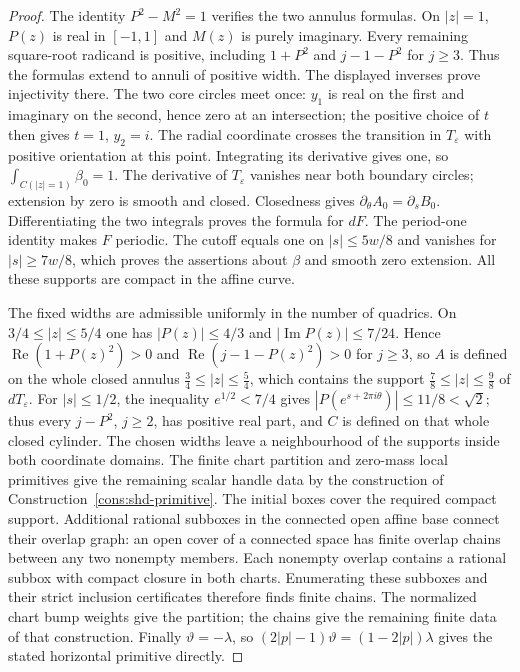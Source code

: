 \begin{proof}
The identity $P^2-M^2=1$ verifies the two annulus formulas. On $|z|=1$, $P(z)$ is real in $[-1,1]$ and $M(z)$ is purely
imaginary. Every remaining square-root radicand is positive, including $1+P^2$ and $j-1-P^2$ for $j\ge3$.
Thus the formulas extend to annuli of positive width. The displayed inverses prove injectivity there.
The two core circles meet once: $y_1$ is real on the first and imaginary on the second, hence zero at an intersection;
the positive choice of $t$ then gives $t=1$, $y_2=i$. The radial coordinate crosses the transition in $T_\varepsilon$
with positive orientation at this point. Integrating its derivative gives one, so $\int_{C(|z|=1)}\beta_0=1$.
The derivative of $T_\varepsilon$ vanishes near both boundary circles; extension by zero is smooth and closed.
Closedness gives $\partial_\theta A_0=\partial_s B_0$. Differentiating the two integrals proves the formula for $dF$.
The period-one identity makes $F$ periodic. The cutoff equals one on $|s|\le5w/8$ and vanishes for $|s|\ge7w/8$,
which proves the assertions about $\beta$ and smooth zero extension. All these supports are compact in the affine curve.

The fixed widths are admissible uniformly in the number of quadrics. On $3/4\le|z|\le5/4$ one has
$|P(z)|\le4/3$ and $|\operatorname{Im}P(z)|\le7/24$. Hence $\operatorname{Re}(1+P(z)^2)>0$ and
$\operatorname{Re}(j-1-P(z)^2)>0$ for $j\ge3$, so $A$ is defined on the whole closed annulus $\frac34\le|z|\le\frac54$, which contains the support
$\frac78\le|z|\le\frac98$ of $dT_\varepsilon$.
For $|s|\le1/2$, the inequality $e^{1/2}<7/4$ gives $|P(e^{s+2\pi i\theta})|\le11/8<\sqrt2$;
thus every $j-P^2$, $j\ge2$, has positive real part, and $C$ is defined on that whole closed cylinder.
The chosen widths leave a neighbourhood of the supports inside both coordinate domains.
The finite chart partition and zero-mass local primitives give the remaining scalar handle data by the construction of
Construction~\ref{cons:shd-primitive}. The initial boxes cover the required compact support.
Additional rational subboxes in the connected open affine base connect their overlap graph: an open cover of a connected
space has finite overlap chains between any two nonempty members. Each nonempty overlap contains a rational subbox
with compact closure in both charts. Enumerating these subboxes and their strict inclusion certificates therefore
finds finite chains. The normalized chart bump weights give the partition; the chains give the remaining finite
data of that construction.
Finally $\vartheta=-\lambda$, so $(2|p|-1)\vartheta=(1-2|p|)\lambda$ gives the stated horizontal primitive directly.
\end{proof}


